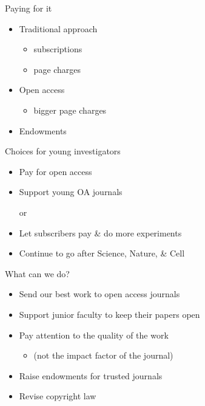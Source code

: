 \documentclass[12pt,t]{beamer}
\newcommand{\bi}{\begin{itemize}}
\newcommand{\ei}{\end{itemize}}
\begin{document}
\begin{frame}{Paying for it}

\vspace{36pt}

\bi
\itemsep12pt
\item Traditional approach
\bi
\item subscriptions
\item page charges
\ei
\item Open access
\bi
\item bigger page charges
\ei
\item Endowments
\ei
\end{frame}

\begin{frame}{Choices for young investigators}

\vspace{36pt}

\bi
\item Pay for open access
\item Support young OA journals

\vspace*{12pt}

\hspace{2cm} {\color{vhilight} \sc or}

\vspace*{12pt}

\item Let subscribers pay \& do more experiments
\item Continue to go after Science, Nature, \& Cell
\ei
\end{frame}


\begin{frame}{What can we do?}

\vspace{36pt}

\bi
\itemsep12pt
\item Send our best work to open access journals
\item Support junior faculty to keep their papers open
\item Pay attention to the quality of the work
\bi
\item[] (not the impact factor of the journal)
\ei
\item Raise endowments for trusted journals
\item {\color<2>{vhilight} Revise copyright law}
\ei
\end{frame}
\end{document}
